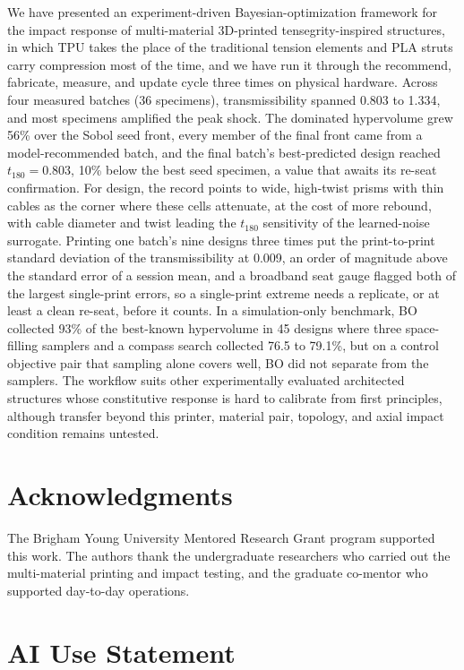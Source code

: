 \documentclass[11pt]{article}
\begin{document}
We have presented an experiment-driven Bayesian-optimization framework
for the impact response of multi-material 3D-printed tensegrity-inspired
structures, in which TPU takes the place of the traditional tension
elements and PLA struts carry compression most of the time, and we have
run it through the recommend, fabricate, measure, and update cycle three
times on physical hardware. Across four measured
batches (36 specimens), transmissibility spanned 0.803 to 1.334, and most
specimens amplified the peak shock. The dominated hypervolume grew 56\%
over the Sobol seed front, every member of the final front came from a
model-recommended batch, and the final batch's best-predicted design
reached $t_{180} = 0.803$, 10\% below the best seed specimen, a value
that awaits its re-seat confirmation. For design, the record points to
wide, high-twist prisms with thin cables as the corner where these cells
attenuate, at the cost of more rebound, with cable diameter and twist
leading the $t_{180}$ sensitivity of the learned-noise surrogate. Printing one batch's nine designs
three times put the print-to-print standard deviation of the
transmissibility at 0.009, an order of magnitude above the standard
error of a session mean, and a broadband seat gauge flagged both of the
largest single-print errors, so a single-print extreme needs a
replicate, or at least a clean re-seat, before it counts. In a
simulation-only benchmark, BO collected 93\% of the best-known
hypervolume in 45 designs where three space-filling samplers and a compass search collected 76.5 to
79.1\%, but on a control objective pair that sampling alone covers well,
BO did not separate from the samplers. The workflow suits other
experimentally evaluated architected structures whose constitutive
response is hard to calibrate from first principles, although transfer
beyond this printer, material pair, topology, and axial impact condition
remains untested.

\section*{Acknowledgments}

The Brigham Young University Mentored Research Grant program supported
this work. The authors thank the undergraduate researchers
who carried out the multi-material printing and impact testing, and the
graduate co-mentor who supported day-to-day operations.

\section*{AI Use Statement}
\end{document}
